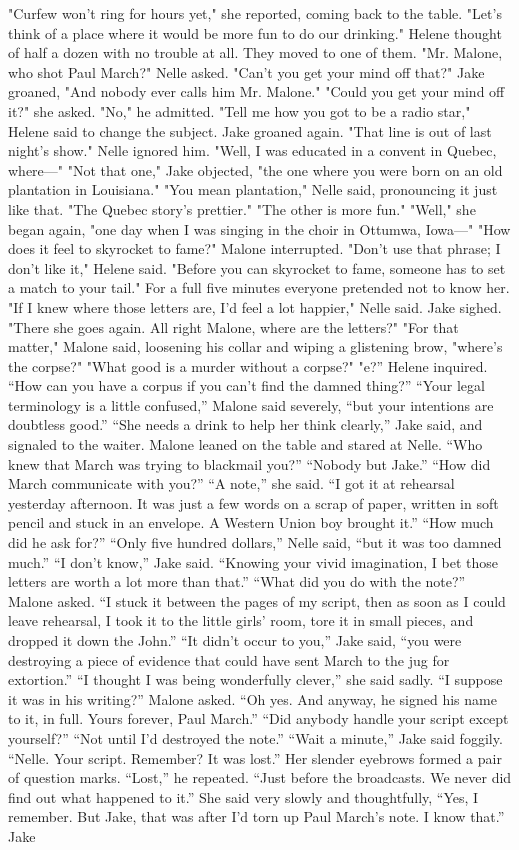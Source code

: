 \documentclass{novel}
\begin{document}
"Curfew won’t ring for hours yet," she reported, coming back to the table. "Let’s think of a place where it would be more fun to do our drinking." Helene thought of half a dozen with no trouble at all. They moved to one of them. "Mr. Malone, who shot Paul March?" Nelle asked. "Can’t you get your mind off that?" Jake groaned, "And nobody ever calls him Mr. Malone." "Could you get your mind off it?" she asked. "No," he admitted. "Tell me how you got to be a radio star," Helene said to change the subject. Jake groaned again. "That line is out of last night’s show." Nelle ignored him. "Well, I was educated in a convent in Quebec, where—" "Not that one," Jake objected, "the one where you were born on an old plantation in Louisiana." "You mean plantation," Nelle said, pronouncing it just like that. "The Quebec story’s prettier." "The other is more fun." "Well," she began again, "one day when I was singing in the choir in Ottumwa, Iowa—" "How does it feel to skyrocket to fame?" Malone interrupted. "Don’t use that phrase; I don’t like it," Helene said. "Before you can skyrocket to fame, someone has to set a match to your tail." For a full five minutes everyone pretended not to know her. "If I knew where those letters are, I’d feel a lot happier," Nelle said. Jake sighed. "There she goes again. All right Malone, where are the letters?" "For that matter," Malone said, loosening his collar and wiping a glistening brow, "where’s the corpse?" "What good is a murder without a corpse?" "e?” Helene inquired. “How can you have a corpus if you can’t find the damned thing?” “Your legal terminology is a little confused,” Malone said severely, “but your intentions are doubtless good.” “She needs a drink to help her think clearly,” Jake said, and signaled to the waiter. Malone leaned on the table and stared at Nelle. “Who knew that March was trying to blackmail you?” “Nobody but Jake.” “How did March communicate with you?” “A note,” she said. “I got it at rehearsal yesterday afternoon. It was just a few words on a scrap of paper, written in soft pencil and stuck in an envelope. A Western Union boy brought it.” “How much did he ask for?” “Only five hundred dollars,” Nelle said, “but it was too damned much.” “I don’t know,” Jake said. “Knowing your vivid imagination, I bet those letters are worth a lot more than that.” “What did you do with the note?” Malone asked. “I stuck it between the pages of my script, then as soon as I could leave rehearsal, I took it to the little girls’ room, tore it in small pieces, and dropped it down the John.” “It didn’t occur to you,” Jake said, “you were destroying a piece of evidence that could have sent March to the jug for extortion.” “I thought I was being wonderfully clever,” she said sadly. “I suppose it was in his writing?” Malone asked. “Oh yes. And anyway, he signed his name to it, in full. Yours forever, Paul March.” “Did anybody handle your script except yourself?” “Not until I'd destroyed the note.” “Wait a minute,” Jake said foggily. “Nelle. Your script. Remember? It was lost.” Her slender eyebrows formed a pair of question marks. “Lost,” he repeated. “Just before the broadcasts. We never did find out what happened to it.” She said very slowly and thoughtfully, “Yes, I remember. But Jake, that was after I’d torn up Paul March’s note. I know that.” Jake 
\end{document}

